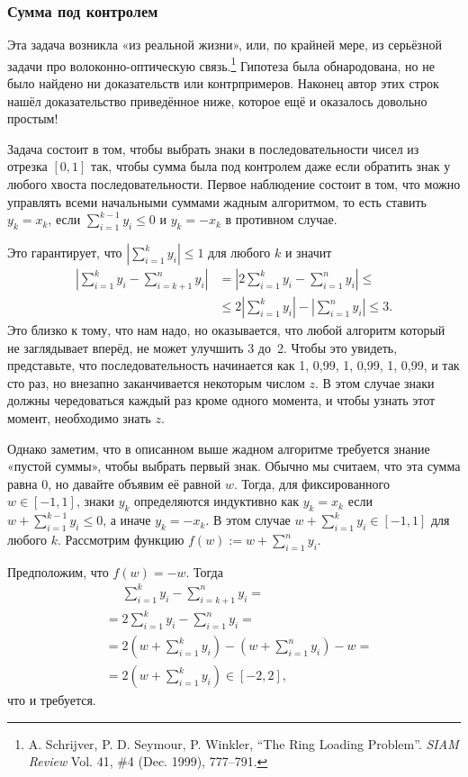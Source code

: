 \subsubsection*{Сумма под контролем}

Эта задача возникла «из реальной жизни», или, по крайней мере, из серьёзной задачи про волоконно-оптическую связь.\footnote{A. Schrijver, P. D. Seymour, P. Winkler, ``The Ring Loading Problem''. \emph{SIAM Review} Vol. 41, \#4 (Dec. 1999), 777--791.}
Гипотеза была обнародована, но не было найдено ни доказательств или контрпримеров.
Наконец автор этих строк нашёл доказательство приведённое ниже, которое ещё и оказалось довольно простым!

\medskip

Задача состоит в том, чтобы выбрать знаки в последовательности чисел из отрезка $[0,1]$ так, чтобы сумма была под контролем даже если обратить знак у любого хвоста последовательности.
Первое наблюдение состоит в том, что можно управлять всеми начальными суммами жадным алгоритмом, то есть ставить $y_k=x_k$, если $\sum_{i=1}^{k-1}y_i \le 0$ и $y_k=-x_k$ в противном случае.

Это гарантирует, что $\left|\sum_{i=1}^{k}y_i\right| \le 1$ для любого $k$ и значит
\begin{align*}
\left|\sum_{i=1}^{k}y_i-\sum_{i=k+1}^{n}y_i\right|&=\left|2\sum_{i=1}^{k}y_i-\sum_{i=1}^{n}y_i\right|\le
\\
&\le2\left|\sum_{i=1}^{k}y_i\right|-\left|\sum_{i=1}^{n}y_i\right|\le3.
\end{align*}
Это близко к тому, что нам надо, но оказывается, что любой алгоритм который не заглядывает вперёд, не может улучшить 3 до~2.
Чтобы это увидеть, представьте, что последовательность начинается как
1, 0,99, 1, 0,99, 1, 0,99, и так сто раз, но внезапно заканчивается некоторым числом $z$.
В этом случае знаки должны чередоваться каждый раз кроме одного момента, и чтобы узнать этот момент, необходимо знать $z$.

Однако заметим, что в описанном выше жадном алгоритме требуется знание «пустой суммы», чтобы выбрать первый знак.
Обычно мы считаем, что эта сумма равна 0, но давайте объявим её равной $w$.
Тогда, для фиксированного $w\in [-1,1]$, знаки $y_k$ определяются индуктивно как $y_k=x_k$ если $w+\sum_{i=1}^{k-1}y_i \le 0$, а иначе $y_k=-x_k$.
В этом случае $w+\sum_{i=1}^{k}y_i \in[-1,1]$ для любого $k$.
Рассмотрим функцию $f(w) \mathop{{:}{=}} w+\sum_{i=1}^ny_i$.

Предположим, что $f(w)=-w$.
Тогда
\begin{align*}
&\phantom{=}\sum_{i=1}^{k}y_i-\sum_{i=k+1}^{n}y_i=
\\
&=2\sum_{i=1}^{k}y_i-\sum_{i=1}^{n}y_i=
\\
&=2\left(w+\sum_{i=1}^{k}y_i\right)-\left(w+\sum_{i=1}^{n}y_i\right)-w=
\\
&=2\left(w+\sum_{i=1}^{k}y_i\right)\in[-2,2],
\end{align*}
что и требуется.

